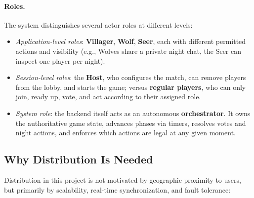 \documentclass{scrartcl}
\begin{document}
\paragraph{Roles.}
The system distinguishes several actor roles at different levels:

\begin{itemize}
    \item \emph{Application-level roles}: \textbf{Villager}, \textbf{Wolf}, \textbf{Seer}, each with different permitted actions and visibility (e.g., Wolves share a private night chat, the Seer can inspect one player per night).
    \item \emph{Session-level roles}: the \textbf{Host}, who configures the match, can remove players from the lobby, and starts the game; versus \textbf{regular players}, who can only join, ready up, vote, and act according to their assigned role.
    \item \emph{System role}: the backend itself acts as an autonomous \textbf{orchestrator}. It owns the authoritative game state, advances phases via timers, resolves votes and night actions, and enforces which actions are legal at any given moment.
\end{itemize}

\subsection{Why Distribution Is Needed}

Distribution in this project is not motivated by geographic proximity to users, but primarily by scalability, real-time synchronization, and fault tolerance:
\end{document}
